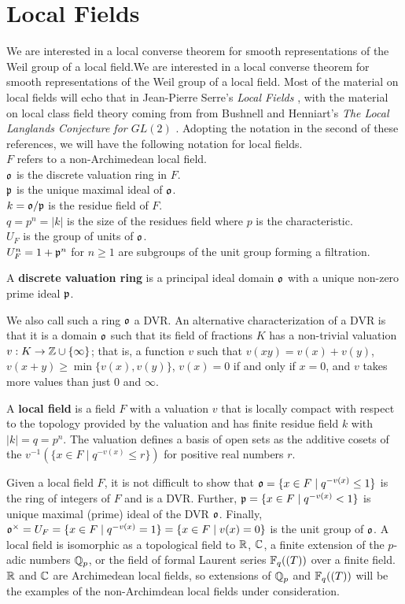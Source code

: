 \section{Local Fields}
We are interested in a local converse theorem for smooth representations of the Weil group of a local field.We are interested in a local converse theorem for smooth representations of the Weil group of a local field.
Most of the material on local fields will echo that in Jean-Pierre Serre's \textit{Local Fields} \cite{Serre1979}, with the material on local class field theory coming from from Bushnell and Henniart's \textit{The Local Langlands Conjecture for $GL(2)$} \cite{Bushnell2006}.
Adopting the notation in the second of these references, we will have the following notation for local fields.\\
$F$ refers to a non-Archimedean local field.\\
$\mathfrak{o}$ is the discrete valuation ring in $F$.\\
$\mathfrak{p}$ is the unique maximal ideal of $\mathfrak{o}$.\\
$k = \mathfrak{o}/\mathfrak{p}$ is the residue field of $F$.\\
$q = p^n = |k|$ is the size of the residues field where $p$ is the characteristic.\\
$U_F$ is the group of units of $\mathfrak{o}$.\\
$U_F^n = 1 + \mathfrak{p}^n$ for $n \geq 1$ are subgroups of the unit group forming a filtration.\\
\begin{defn}
  A \textbf{discrete valuation ring} is a principal ideal domain $\mathfrak{o}$ with a unique non-zero prime ideal $\mathfrak{p}$.
\end{defn}
We also call such a ring $\mathfrak{o}$ a DVR.
An alternative characterization of a DVR is that it is a domain $\mathfrak{o}$ such that its field of fractions $K$ has a non-trivial valuation $v : K \to \mathbb{Z} \cup \{ \infty \}$; that is, a function $v$ such that $v(xy) = v(x) + v(y)$, $v(x+y) \geq \min \{v(x),v(y)\}$, $v(x) = 0$ if and only if $x = 0$, and $v$ takes more values than just $0$ and $\infty$.
\begin{defn}
  A \textbf{local field} is a field $F$ with a valuation $v$ that is locally compact with respect to the topology provided by the valuation and has finite residue field $k$ with $|k| = q = p^n$.
  The valuation defines a basis of open sets as the additive cosets of the $v^{-1}(\{x \in F \mid q^{-v(x)} \leq r\})$ for positive real numbers $r$.
\end{defn}
Given a local field $F$, it is not difficult to show that $\mathfrak{o} = \{x \in F \mid q^{-v(x)} \leq 1\}$ is the ring of integers of $F$ and is a DVR.
Further, $\mathfrak{p} = \{x \in F \mid q^{-v(x)} < 1\}$ is unique maximal (prime) ideal of the DVR $\mathfrak{o}$.
Finally, $\mathfrak{o}^\times = U_F = \{x \in F \mid q^{-v(x)} = 1\} = \{x \in F \mid v(x) = 0\}$ is the unit group of $\mathfrak{o}$.
A local field is isomorphic as a topological field to $\mathbb{R}$, $\mathbb{C}$, a finite extension of the $p$-adic numbers $\mathbb{Q}_p$, or the field of formal Laurent series $\mathbb{F}_q((T))$ over a finite field.
$\mathbb{R}$ and $\mathbb{C}$ are Archimedean local fields, so extensions of $\mathbb{Q}_p$ and $\mathbb{F}_q((T))$ will be the examples of the non-Archimdean local fields under consideration.
\\

